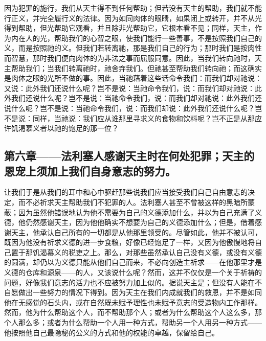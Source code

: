 因为犯罪的施行，我们从天主得不到任何帮助；但若没有天主的帮助，我们就不能行正义，并完全履行义的法律。因为如同肉体的眼睛，如果闭上或转开，并不从光得到帮助，但光帮助它观看，并且除非光帮助它，它根本看不见；同样，天主，作为内在人的光，帮助我们的心智之眼，使我们能行一些善事，不是按照我们自己的义，而是按照祂的义。但我们若转离祂，那是我们自己的行为；那时我们是按肉性而智慧，那时我们便向肉体的为非法之事而屈服同意。因此，当我们转向祂时，天主帮助我们；当我们转离祂时，祂舍弃我们。但祂甚至帮助我们转向祂；而这确实是肉体之眼的光所不做的事。因此，当祂藉着这些话命令我们：而我们却对祂说：又说：此外我们还说什么呢？岂不是说：当祂命令我们，说：而我们却对祂说：此外我们还说什么呢？岂不是说：当祂命令我们，说：而我们却对祂说：此外我们还说什么呢？岂不是说：当祂命令我们，说：而我们却说：此外我们还说什么呢？岂不是说：同样，当祂说：我们应从谁那里寻求义的食物和饮料呢？岂不正是从那应许饥渴慕义者以祂的饱足的那一位？\par


\subsection{第六章——法利塞人感谢天主时在何处犯罪；天主的恩宠上须加上我们自身意志的努力。}

让我们于是从我们的耳中和心中驱赶那些说我们应当接受我们自己自由意志的决定，而不必祈求天主帮助我们不犯罪的人。法利塞人甚至不曾被这样的黑暗所蒙蔽；因为虽然他错误地认为他不需要为自己的义德添加什么，并以为自己充满了义德，他仍然感谢天主，因为他他确实不想要为自己的义德添加什么；但是，借着感谢天主，他承认自己所有的一切都是从他那里领受的。尽管如此，他并不被认可，既因为他没有祈求义德的进一步食粮，好像已经饱足了一样，又因为他傲慢地将自己置于那饥渴慕义的税吏之上。那么，对那些虽然承认自己没有义德，或没有义德的圆满，却仍以为义德只能从他们自己而来，不必向创造主祈求——在他那里才是义德的仓库和源泉——的人，又该说什么呢？然而，这并不仅仅是一个关于祈祷的问题，好像我们意志的活力也不应被努力加上似的。据说天主是；但没有人能在不自愿做出一些努力的情况下得到。因为天主在我们内成就我们的救恩，并不是如同他在无感觉的石头内，或在自然既未赋予理性也未赋予意志的受造物内工作那样。然而，他为什么帮助这个人，而不帮助那个人；或者为什么帮助这个人这么多，那个人那么多；或者为什么帮助一个人用一种方式，帮助另一个人用另一种方式——他按照他自己最隐秘的公义的方式和他的权能的卓越，保留给自己。\par

